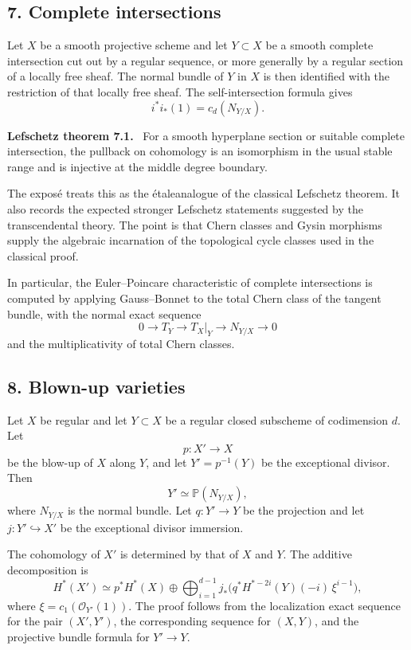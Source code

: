 \documentclass[14pt]{extarticle}
\newcommand{\cO}{\mathcal O}
\providecommand{\etale}{\'{e}tale}
\newenvironment{statement}[1]{\par\medskip\noindent\textbf{#1.}\ }{\par\medskip}
\begin{document}
\subsection*{7. Complete intersections}

Let $X$ be a smooth projective scheme and let $Y\subset X$ be a smooth complete intersection cut out by a regular sequence, or more generally by a regular section of a locally free sheaf. The normal bundle of $Y$ in $X$ is then identified with the restriction of that locally free sheaf. The self-intersection formula gives
\[
   i^*i_*(1)=c_d(N_{Y/X}).
\]

\begin{statement}{Lefschetz theorem 7.1}
For a smooth hyperplane section or suitable complete intersection, the pullback on cohomology is an isomorphism in the usual stable range and is injective at the middle degree boundary.
\end{statement}

The expos\'e treats this as the \etale analogue of the classical Lefschetz theorem. It also records the expected stronger Lefschetz statements suggested by the transcendental theory. The point is that Chern classes and Gysin morphisms supply the algebraic incarnation of the topological cycle classes used in the classical proof.

In particular, the Euler--Poincare characteristic of complete intersections is computed by applying Gauss--Bonnet to the total Chern class of the tangent bundle, with the normal exact sequence
\[
   0\to T_Y\to T_X|_Y\to N_{Y/X}\to0
\]
and the multiplicativity of total Chern classes.

\subsection*{8. Blown-up varieties}

Let $X$ be regular and let $Y\subset X$ be a regular closed subscheme of codimension $d$. Let
\[
   p:X'\to X
\]
be the blow-up of $X$ along $Y$, and let $Y'=p^{-1}(Y)$ be the exceptional divisor. Then
\[
   Y'\simeq \mathbb P(N_{Y/X}),
\]
where $N_{Y/X}$ is the normal bundle. Let $q:Y'\to Y$ be the projection and let $j:Y'\hookrightarrow X'$ be the exceptional divisor immersion.

The cohomology of $X'$ is determined by that of $X$ and $Y$. The additive decomposition is
\[
   H^*(X')\simeq p^*H^*(X)\oplus
      \bigoplus_{i=1}^{d-1} j_*\bigl(q^*H^{*-2i}(Y)(-i)\,\xi^{i-1}\bigr),
\]
where $\xi=c_1(\cO_{Y'}(1))$. The proof follows from the localization exact sequence for the pair $(X',Y')$, the corresponding sequence for $(X,Y)$, and the projective bundle formula for $Y'\to Y$.
\end{document}
